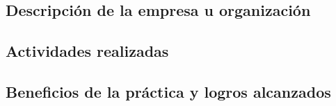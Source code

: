 \blindmathpaper %
\subsection{Descripción de la empresa u organización}
\subsection{Actividades realizadas}
\subsection{Beneficios de la práctica y logros alcanzados}